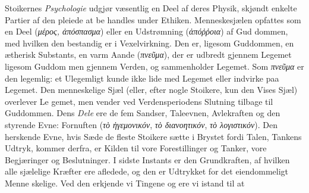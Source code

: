 \documentclass[12pt,a4paper]{book}
\newcommand{\gk}[1]{\textit{#1}}
\begin{document}
Stoikernes \emph{Psychologie} udgjør væsentlig en Deel af
deres Physik, skjøndt enkelte Partier af den pleiede at be\-%
handles under Ethiken. Menneskesjælen opfattes som en Deel
(\gk{μέρος, ἀπόσπασμα}) eller en Udstrømning (\gk{ἀπόῤῥοια}) af Gud\-%
dommen, med hvilken den bestandig er i Vexelvirkning. Den
er, ligesom Guddommen, en ætherisk Substants, en varm Aande
(\gk{πνεῦμα}), der er udbredt gjennem Legemet ligesom Guddom\-%
men gjennem Verden, og sammenholder Legemet. Som
\gk{πνεῦμα} er den legemlig: et Ulegemligt kunde ikke lide med
Legemet eller indvirke paa Legemet. Den menneskelige Sjæl
(eller, efter nogle Stoikere, kun den Vises Sjæl) overlever Le\-%
gemet, men vender ved Verdensperiodens Slutning tilbage til
Guddommen. Dens \emph{Dele} ere de fem Sandser, Taleevnen,
Avlekraften og den styrende Evne: Fornuften (\gk{τὸ ἡγεμονικόν},
\gk{τὸ διανοητικόν}, \gk{τὸ λογιστικόν}). Den herskende Evne, hvis
Sæde de fleste Stoikere sætte i Brystet fordi Talen, Tankens
Udtryk, kommer derfra, er Kilden til vore Forestillinger og
Tanker, vore Begjæringer og Beslutninger. I sidste Instants
er den Grundkraften, af hvilken alle sjælelige Kræfter ere
afledede, og den er Udtrykket for det eiendommeligt Menne\-%
skelige. Ved den erkjende vi Tingene og ere vi istand til at
\end{document}
